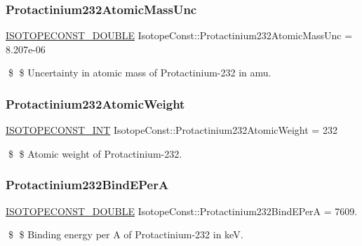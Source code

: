 \subsubsection{\texorpdfstring{Protactinium232\+Atomic\+Mass\+Unc}{Protactinium232AtomicMassUnc}}
{\footnotesize\ttfamily \mbox{\hyperlink{group___isotope_const-_macros_ga8f45a7272ce02c0b4c65c44636ed719a}{I\+S\+O\+T\+O\+P\+E\+C\+O\+N\+S\+T\+\_\+\+D\+O\+U\+B\+LE}} Isotope\+Const\+::\+Protactinium232\+Atomic\+Mass\+Unc = 8.\+207e-\/06}

\$ \$ Uncertainty in atomic mass of Protactinium-\/232 in amu. \mbox{\label{group___isotope_const-_protactinium-_pa232_gac1444373d1d6ef0eeef96840574588fd}} 
\subsubsection{\texorpdfstring{Protactinium232\+Atomic\+Weight}{Protactinium232AtomicWeight}}
{\footnotesize\ttfamily \mbox{\hyperlink{group___isotope_const-_macros_ga5f18360b3e99483a35c32d789e62621c}{I\+S\+O\+T\+O\+P\+E\+C\+O\+N\+S\+T\+\_\+\+I\+NT}} Isotope\+Const\+::\+Protactinium232\+Atomic\+Weight = 232}

\$ \$ Atomic weight of Protactinium-\/232. \mbox{\label{group___isotope_const-_protactinium-_pa232_ga776d6bbfb2ed5cc29a0231adc9d750ba}} 
\subsubsection{\texorpdfstring{Protactinium232\+Bind\+E\+PerA}{Protactinium232BindEPerA}}
{\footnotesize\ttfamily \mbox{\hyperlink{group___isotope_const-_macros_ga8f45a7272ce02c0b4c65c44636ed719a}{I\+S\+O\+T\+O\+P\+E\+C\+O\+N\+S\+T\+\_\+\+D\+O\+U\+B\+LE}} Isotope\+Const\+::\+Protactinium232\+Bind\+E\+PerA = 7609.}

\$ \$ Binding energy per A of Protactinium-\/232 in keV. \mbox{\label{group___isotope_const-_protactinium-_pa232_ga79f6dc62093001c5e06190e26eb695ae}} 
